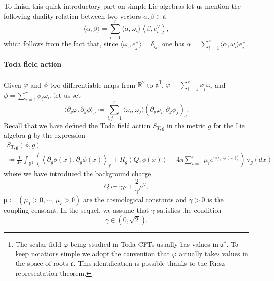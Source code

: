 \documentclass[AHL,Unicode,longabstracts,published]{cedram}
\newcommand{\frkg}{\mathfrak{g}}
\newcommand{\frka}{\mathfrak{a}}
\newcommand{\rmv}{\mathrm{v}}
\newcommand{\R}{\mathbb{R}}
\newcommand{\ps}[1]{\langle #1 \rangle}
\newcommand*\green[1]{#1}
\begin{document}
To finish this quick introductory part on simple Lie algebras let us mention the following duality relation between two vectors $\alpha,\beta\in\frka$
\begin{equation}\label{dual}
\langle\alpha, \beta \rangle= \sum_{i=1}^{r} \langle\alpha,\omega_i \rangle \left\langle\beta,e_i^{\vee} \right\rangle,
\end{equation}
which follows from the fact that, since $\ps{\omega_i,e_j^\vee}=\delta_{ij}$, one has $\alpha=\sum_{i=1}^r\ps{\alpha,\omega_i}e_i^\vee$.

\paragraph{Toda field action}
Given $\varphi$ and $\phi$ two differentiable maps from $\R^2$ to $\frka$\footnote{The scalar field $\varphi$ being studied in Toda CFTs usually has values in $\frka^*$. To keep notations simple we adopt the convention that $\varphi$ actually takes values in the space of roots $\frka$. This identification is possible thanks to the Riesz representation theorem.}, $\varphi=\sum_{i=1}^{r}\varphi_i \omega_i$ and $\phi=\sum_{i=1}^{r}\phi_i\omega_i$, let us set
\begin{equation}\label{defscalar}
\langle\partial_g\varphi,\partial_g\phi \rangle_g\coloneqq \sum_{i,j=1}^{r} \langle \omega_i,\omega_j \rangle(\partial_g\varphi_i,\partial_g\phi_j)_g.
\end{equation}
Recall that we have defined the Toda field action $S_{T,\frkg}$ in the metric $g$ for the Lie algebra $\frkg$ by the expression
\begin{multline}
S_{T,\frkg}(\phi,g)\\
\coloneqq \frac{1}{4\pi} \int_{\R^2} \left (\left\langle\partial_{g} \phi(x), \partial_{g} \phi(x) \right\rangle_{g} +R_g \left\langle Q, \phi(x) \right\rangle +4\pi \sum_{i=1}^{r} \mu_i e^{\gamma \langle e_i,\green\phi(x) \rangle} \right)\,\rmv_{g}(dx)
\end{multline}
where we have introduced the background charge
\begin{equation}
Q\coloneqq \gamma\rho+\frac2\gamma\rho^\vee,
\end{equation}
$\bm \mu\coloneqq (\mu_1>0,\cdots,\,\mu_r>0)$ are the cosmological constants and $\gamma >0$ is the coupling constant. In the sequel, we assume that $\gamma$ satisfies the condition
\begin{equation}\label{condgamma}
\gamma \in \left(0,\sqrt{2}\right).
\end{equation}
\end{document}
